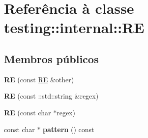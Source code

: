 \hypertarget{classtesting_1_1internal_1_1RE}{\section{Referência à classe testing\-:\-:internal\-:\-:R\-E}
\label{classtesting_1_1internal_1_1RE}
}
\subsection*{Membros públicos}
\begin{DoxyCompactItemize}
\item 
\hypertarget{classtesting_1_1internal_1_1RE_ab215dbc2565fce641e1746ca43e9d68a}{{\bfseries R\-E} (const \hyperlink{classtesting_1_1internal_1_1RE}{R\-E} \&other)}\label{classtesting_1_1internal_1_1RE_ab215dbc2565fce641e1746ca43e9d68a}

\item 
\hypertarget{classtesting_1_1internal_1_1RE_a8840bd639642f3d4769a94a68ce463c2}{{\bfseries R\-E} (const \-::std\-::string \&regex)}\label{classtesting_1_1internal_1_1RE_a8840bd639642f3d4769a94a68ce463c2}

\item 
\hypertarget{classtesting_1_1internal_1_1RE_a908ea936a5b7a14479a1b292a7189ca6}{{\bfseries R\-E} (const char $\ast$regex)}\label{classtesting_1_1internal_1_1RE_a908ea936a5b7a14479a1b292a7189ca6}

\item 
\hypertarget{classtesting_1_1internal_1_1RE_acb67d77f53e73af81cce6dcd663c94df}{const char $\ast$ {\bfseries pattern} () const }\label{classtesting_1_1internal_1_1RE_acb67d77f53e73af81cce6dcd663c94df}

\end{DoxyCompactItemize}
